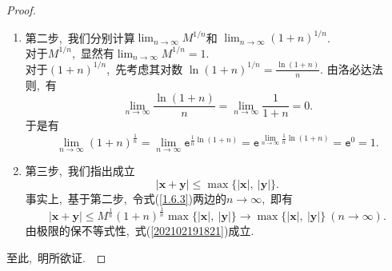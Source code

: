 \documentclass[UTF8, twoside]{ctexart}
\theoremstyle{nonumberplain}
\newtheorem{proof}{\heiti 证明}  %
\theoremstyle{nonumberplain}
\theoremstyle{plain}
\begin{document}
\begin{proof}
\begin{enumerate}
\begin{enumerate}
				\item 第二步,\ 我们分别计算$\lim_{n \rightarrow \infty} M^{{1}/{n}}$和
				$\lim_{n \rightarrow \infty} \left( 1+n \right)^{{1}/{n}}$. \\ 
				对于$M^{{1}/{n}}$,\ 显然有$\lim_{n \rightarrow \infty}M^{{1}/{n}} = 1$. \\
				对于$\left( 1+n \right) ^ {{1}/{n}}$,\ 先考虑其对数
				$\ln \left( 1+n \right) ^ {{1}/{n}} = \frac{\ln \left( 1+n \right)}{n}$.
				由洛必达法则\cite[第六章 \S~2]{shuxuefenxi1},\ 有
				\begin{equation*}
					\lim_{n \rightarrow \infty} \frac{\ln \left( 1+n \right)}{n} = 
					\lim_{n \rightarrow \infty} \frac{1}{1+n} = 0.
				\end{equation*}
				于是有
				\begin{equation*}
					\lim_{n \rightarrow \infty} \left( 1+n \right) ^ {\frac{1}{n}} = 
					\lim_{n \rightarrow \infty} \mathtt{e} ^ {\frac{1}{n} \ln \left( 1+n \right)} = 
					\mathtt{e} ^ {\lim_{n \rightarrow \infty} \frac{1}{n} \ln \left( 1+n \right)} = 
					\mathtt{e}^0 = 1.
				\end{equation*}
				\vskip 0.3cm
				
				\item 第三步,\ 我们指出成立
				\begin{equation} \label{202102191821}
					\left| \bm{x}+\bm{y} \right| \le \max\{\left| \bm{x} \right|,\ \left| \bm{y} \right|\}.
				\end{equation}
				事实上,\ 基于第二步,\ 令式(\ref{1.6.3})两边的$n \rightarrow \infty$,\ 即有
				\begin{equation*}
					\left| \bm{x}+\bm{y} \right| \le M^{\frac{1}{n}} \left( 1+n \right)^{\frac{1}{n}} 
					\max\{\left| \bm{x} \right|,\ \left| \bm{y} \right|\} \rightarrow
					\max\{\left| \bm{x} \right|,\ \left| \bm{y} \right|\}\ \left( n \rightarrow \infty \right).
				\end{equation*}
			由极限的保不等式性\cite[定理2.5]{shuxuefenxi1},\ 式(\ref{202102191821})成立.
			\end{enumerate}
		\end{enumerate}
		\vskip 0.3cm
		至此,\ 明所欲证.\ 
	\end{proof}
	
\end{document}
